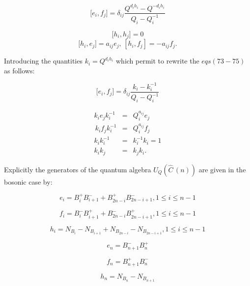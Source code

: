 \documentclass[a4paper,12pt,thmsa]{article}
\begin{document}
\begin{equation}
\lbrack e_i,f_j]=\delta _{ij}\frac{Q^{d_ih_i}-Q^{-d_ih_i}}{Q_i-Q_i^{-1}}
\end{equation}

\begin{equation}
\lbrack h_i,h_j]=0
\end{equation}
\begin{equation}
\lbrack h_i,e_j]=a_{ij}e_j,\, [h_i,f_j]=-a_{ij}f_j.
\end{equation}

Introducing the quantities $k_i=Q^{d_ih_i}$ which permit to rewrite the $%
eqs(73-75)$ as follows:

\begin{equation}
\lbrack e_{i},f_{j}]=\delta _{ij}\frac{k_{i}-k_{i}^{-1}}{Q_{i}-Q_{i}^{-1}}
\end{equation}

\begin{eqnarray}
k_ie_jk_i^{-1} &=&Q_i^{a_{ij}}e_j \\ \, k_if_jk_i^{-1}
&=&Q_i^{a_{ij}}f_j \\ k_ik_i^{-1} &=&k_i^{-1}k_i=1 \\
k_ik_j&=&k_jk_i.
\end{eqnarray}

Explicitly the generators of the quantum algebra $U_Q(\widehat{C}_{\, %
}(n))$ are given in the bosonic case by:

\begin{equation}
e_{i}=B_{i}^{+}B_{i+1}^{-}+B_{2n-i}^{+}B_{2n-i+1}^{-},1\leq i\leq n-1
\end{equation}

\begin{equation}
f_{i}=B_{i}^{-}B_{i+1}^{+}+B_{2n-i}^{-}B_{2n-i+1}^{+},1\leq i\leq n-1
\end{equation}

\begin{equation}
h_{i}=N_{B_{i}}-N_{B_{i+1}}+N_{B_{2n-i}}-N_{B_{2n-i+1}},1\leq i\leq n-1
\end{equation}

\begin{equation}
e_{n}=B_{n+1}^{-}B_{n}^{+}
\end{equation}

\begin{equation}
f_{n}=B_{n+1}^{+}B_{n}^{-}
\end{equation}

\begin{equation}
h_{n}=N_{B_{n}}-N_{B_{n+1}}
\end{equation}
\end{document}
